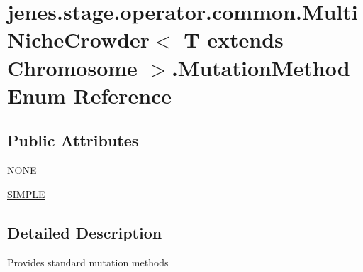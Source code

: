 \hypertarget{enumjenes_1_1stage_1_1operator_1_1common_1_1_multi_niche_crowder_3_01_t_01extends_01_chromosome_01_4_1_1_mutation_method}{\section{jenes.\-stage.\-operator.\-common.\-Multi\-Niche\-Crowder$<$ T extends Chromosome $>$.Mutation\-Method Enum Reference}
\label{enumjenes_1_1stage_1_1operator_1_1common_1_1_multi_niche_crowder_3_01_t_01extends_01_chromosome_01_4_1_1_mutation_method}
}
\subsection*{Public Attributes}
\begin{DoxyCompactItemize}
\item 
\hyperlink{enumjenes_1_1stage_1_1operator_1_1common_1_1_multi_niche_crowder_3_01_t_01extends_01_chromosome_01_4_1_1_mutation_method_a9e171778596ab5f0bd247b0c35174bcd}{N\-O\-N\-E}
\item 
\hyperlink{enumjenes_1_1stage_1_1operator_1_1common_1_1_multi_niche_crowder_3_01_t_01extends_01_chromosome_01_4_1_1_mutation_method_a9ca9e9b6a72dcfaec58f48468161813b}{S\-I\-M\-P\-L\-E}
\end{DoxyCompactItemize}


\subsection{Detailed Description}
Provides standard mutation methods 

